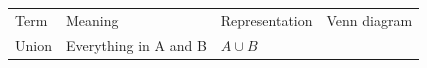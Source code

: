     \setlength\mytableroom{\mytablewidth}
    \addtolength\mytableroom{-\mytablespace}
    \setlength\myfixedwidth{0pt}
    \setlength\mystarwidth{\mytableroom}
        \addtolength\mystarwidth{-\myfixedwidth}
        \divide{}
        \begin{center}
      \label{m39373*eip-360}
    \noindent
      \tablelasttail{}
      \begin{xtabular*}{\mytablewidth}[t]{|p{10\mystarwidth}|p{10\mystarwidth}|p{10\mystarwidth}|p{10\mystarwidth}|}\hline
        Term &
        Meaning &
        Representation &
        Venn diagram%
     \tabularnewline{}
        Union &
        Everything in A and B &
        $A\cup B$ &
    \setcounter{subfigure}{0}
\label{m39373*uid14547}

\end{xtabular*}
\end{center}
